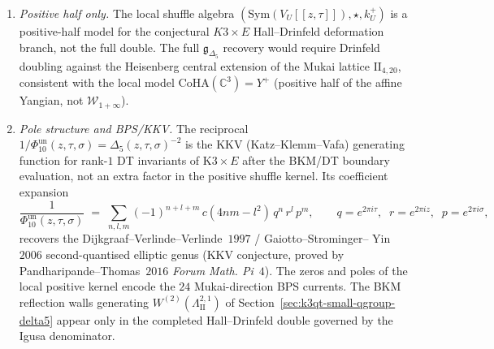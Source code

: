 \begin{conjecture}
\begin{enumerate}[label=\textup{(\roman*)}]
$\theta_1(z\mid\tau)$ to $z$ and
\(k^+_{U,E}\) degenerates to the Negut rational kernel
$k_{\mathbb A^2}$ fibred over the $24$ Mukai directions of
Equation~\eqref{eq:k3qt-shuffle-convolution-negut}, verifying
consistency with Schiffmann--Vasserot~$2013$ \emph{Duke}~$162$
Thm.~$4.5.2$.
\item \emph{Positive half only.} The local shuffle algebra
\((\mathrm{Sym}(V_U[[z,\tau]]),\star,k^+_U)\) is a positive-half
model for the conjectural \(K3\times E\) Hall--Drinfeld deformation
branch, not the full double. The full $\mathfrak g_{\Delta_5}$ recovery would require Drinfeld
doubling against the Heisenberg central extension of the Mukai
lattice $\mathrm{II}_{4, 20}$, consistent with the local model
$\mathrm{CoHA}(\mathbb C^3) = Y^+$ (positive half of the affine
Yangian, not $\mathcal W_{1 + \infty}$).
\item \emph{Pole structure and BPS/KKV.} The reciprocal
$1/\Phi_{10}^{\mathrm{un}}(z,\tau,\sigma)
=\Delta_5(z,\tau,\sigma)^{-2}$ is the KKV
(Katz--Klemm--Vafa) generating function for rank-$1$ DT invariants of
$\mathrm{K3} \times E$ after the BKM/DT boundary evaluation, not an
extra factor in the positive shuffle kernel. Its coefficient expansion
\[
\frac{1}{\Phi_{10}^{\mathrm{un}}(z, \tau, \sigma)}
\;=\;
\sum_{n, l, m}
 (-1)^{n + l + m}\,
 c(4nm - l^2)\,
 q^n\,r^l\,p^m,
\qquad q = e^{2\pi i\tau},\;\;
r = e^{2\pi i z},\;\;
p = e^{2\pi i\sigma},
\]
recovers the Dijkgraaf--Verlinde--Verlinde~$1997$ / Gaiotto--Strominger--
Yin~$2006$ second-quantised elliptic genus (KKV conjecture, proved by
Pandharipande--Thomas~$2016$ \emph{Forum Math. Pi}~$4$). The zeros and
poles of the local positive kernel encode the \(24\) Mukai-direction BPS
currents. The BKM reflection walls generating
$W^{(2)}(\Lambda_{\mathrm{II}}^{2,1})$ of
Section~\ref{sec:k3qt-small-qgroup-delta5} appear only in the completed
Hall--Drinfeld double governed by the Igusa denominator.
\end{enumerate}
\end{conjecture}

